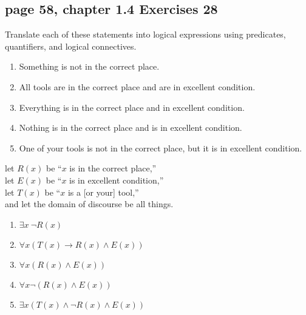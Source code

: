 \documentclass[sigconf]{acmart}
\begin{document}
\subsection{page 58, chapter 1.4 Exercises 28}
\begin{shaded}
    Translate each of these statements into logical expressions using predicates, quantifiers, and logical connectives.
    \begin{enumerate}[label=(\alph*)]
        \item Something is not in the correct place.
        \item All tools are in the correct place and are in excellent
        condition.
        \item Everything is in the correct place and in excellent
        condition.
        \item Nothing is in the correct place and is in excellent condition.
        \item One of your tools is not in the correct place, but it is
        in excellent condition.
    \end{enumerate}
\end{shaded}  
let $R(x)$ be “$x$ is in the correct place,”\\
let $E(x)$ be “$x$ is in excellent condition,”\\
let $T(x)$ be “$x$ is a [or your] tool,”\\ and let the domain of discourse be all things.
\begin{enumerate}[label=(\alph*)]
	\item $\exists x ~ \neg R(x)$
	\item \underline{$\forall x (T(x)\rightarrow R(x)\land E(x))$}
	\item \underline{$\forall x (R(x)\land E(x))$}
	\item \underline{$\forall x \neg(R(x)\land E(x))$}
	\item \underline{$\exists x (T(x)\land \neg R(x)\land E(x))$}
\end{enumerate}
\end{document}
